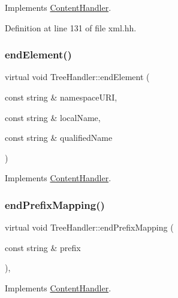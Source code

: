 Implements \mbox{\hyperlink{class_content_handler_a21fb351a3987017008caafcc2c60834b}{Content\+Handler}}.



Definition at line 131 of file xml.\+hh.

\mbox{\label{class_tree_handler_a1db61f3d4f1425dcdd82166ea636fd4f}} 
\subsubsection{\texorpdfstring{endElement()}{endElement()}}
{\footnotesize\ttfamily virtual void Tree\+Handler\+::end\+Element (\begin{DoxyParamCaption}\item[{const string \&}]{namespace\+U\+RI,  }\item[{const string \&}]{local\+Name,  }\item[{const string \&}]{qualified\+Name }\end{DoxyParamCaption})\hspace{0.3cm}{\ttfamily [virtual]}}



Implements \mbox{\hyperlink{class_content_handler_a83a93a2fec8354b96e7ea462e65545af}{Content\+Handler}}.

\mbox{\label{class_tree_handler_ac4634964bc8b641168519c844cafaaf6}} 
\subsubsection{\texorpdfstring{endPrefixMapping()}{endPrefixMapping()}}
{\footnotesize\ttfamily virtual void Tree\+Handler\+::end\+Prefix\+Mapping (\begin{DoxyParamCaption}\item[{const string \&}]{prefix }\end{DoxyParamCaption})\hspace{0.3cm}{\ttfamily [inline]}, {\ttfamily [virtual]}}



Implements \mbox{\hyperlink{class_content_handler_a8eb3c33c544eca57340d7dd61396f399}{Content\+Handler}}.



